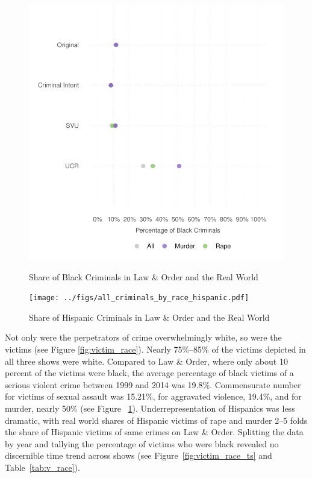 \documentclass[12pt, letterpaper]{article}
\begin{document}
\begin{figure}[!htbp]
\centering
\caption{Share of Black Criminals in Law \& Order and the Real World}
\includegraphics[scale=.9]{../figs/all_criminals_by_race.pdf}
\label{fig:perp_race}
\end{figure}

\begin{figure}[htbp]
\centering
\caption{Share of Hispanic Criminals in Law \& Order and the Real World}
\texttt{[image: ../figs/all\_criminals\_by\_race\_hispanic.pdf]}
\label{fig:perp_race_hispanic}
\end{figure}

Not only were the perpetrators of crime overwhelmingly white, so were the victims (see Figure \ref{fig:victim_race}). Nearly 75\%--85\% of the victims depicted in all three shows were white. Compared to Law \& Order, where only about 10 percent of the victims were black, the average percentage of black victims of a serious violent crime between 1999 and 2014 was 19.8\%. Commensurate number for victims of sexual assault was 15.21\%, for aggravated violence, 19.4\%, and for murder, nearly 50\% (see Figure ~\ref{fig:perp_race}). Underrepresentation of Hispanics was less dramatic, with real world shares of Hispanic victims of rape and murder 2--5 folds the share of Hispanic victims of same crimes on Law \& Order. Splitting the data by year and tallying the percentage of victims who were black revealed no discernible time trend across shows (see Figure~\ref{fig:victim_race_ts} and Table~\ref{tab:v_race}). 
\end{document}
